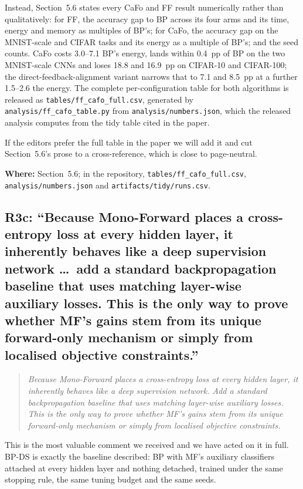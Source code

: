 \documentclass[11pt,a4paper]{article}
\newcommand{\FF}{FF}
\newcommand{\MF}{MF}
\newcommand{\BP}{BP}
\newcommand{\CaFo}{CaFo}
\newcommand{\BPDS}{BP-DS}
\newenvironment{comment}%
  {\begin{quote}\itshape\small}%
  {\end{quote}}
\newcommand{\where}[1]{\par\smallskip\noindent\textbf{Where:} #1\par}
\begin{document}
Instead, Section~5.6 states every \CaFo{} and \FF{} result numerically rather
than qualitatively: for \FF{}, the accuracy gap to \BP{} across its four arms
and its time, energy and memory as multiples of \BP{}'s; for \CaFo{}, the
accuracy gap on the MNIST-scale and CIFAR tasks and its energy as a multiple
of \BP{}'s; and the seed counts. \CaFo{} costs
\SIrange{3.0}{7.1}{\times} \BP{}'s energy, lands within \num{0.4}~pp of
\BP{} on the two MNIST-scale CNNs and loses \num{18.8} and \num{16.9}~pp on
CIFAR-10 and CIFAR-100; the direct-feedback-alignment variant narrows that to
\num{7.1} and \num{8.5}~pp at a further \SIrange{1.5}{2.6}{\times} the energy. The
complete per-configuration table for both algorithms is released as
\texttt{tables/ff\_cafo\_full.csv}, generated by
\texttt{analysis/ff\_cafo\_table.py} from \texttt{analysis/numbers.json}, which
the released analysis computes from the tidy table cited in the paper.

If the editors prefer the full table in the paper we will add it and cut
Section~5.6's prose to a cross-reference, which is close to page-neutral.

\where{Section~5.6; in the repository, \texttt{tables/\allowbreak ff\_cafo\_full.csv},
\texttt{analysis/\allowbreak numbers.json} and
\texttt{artifacts/\allowbreak tidy/\allowbreak runs.csv}.}

\subsection*{R3c: ``Because Mono-Forward places a cross-entropy loss at
every hidden layer, it inherently behaves like a deep supervision network
\dots\ add a standard backpropagation baseline that uses matching layer-wise
auxiliary losses. This is the only way to prove whether MF's gains stem from
its unique forward-only mechanism or simply from localised objective
constraints.''}

\begin{comment}
Because Mono-Forward places a cross-entropy loss at every hidden layer, it
inherently behaves like a deep supervision network. Add a standard
backpropagation baseline that uses matching layer-wise auxiliary losses. This
is the only way to prove whether MF's gains stem from its unique forward-only
mechanism or simply from localised objective constraints.
\end{comment}

\noindent
This is the most valuable comment we received and we have acted on it in full.
\BPDS{} is exactly the baseline described: \BP{} with \MF{}'s auxiliary
classifiers attached at every hidden layer and nothing detached, trained under
the same stopping rule, the same tuning budget and the same seeds.
\end{document}
